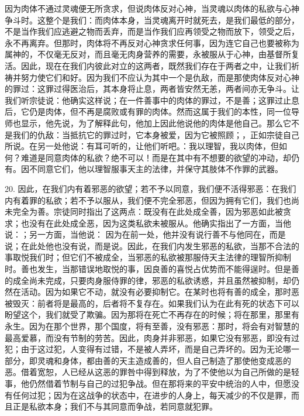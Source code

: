 因为肉体不通过灵魂便无所贪求，但说肉体反对心神，当灵魂以肉体的私欲与心神争斗时。这整个是我们：而肉体本身，当灵魂离开时就死去，是我们最低的部分，不是当作我们应逃避之物而丢弃，而是当作我们应再领受之物而放下，领受之后，永不再离弃。但那时，肉体将不再反对心神贪求任何事，因为连它自己也要被称为属神的，不仅毫无反对，而且毫无肉身营养的需要，永被服从于心神，由基督所复活。因此，现在在我们内彼此对立的这两者，既然我们存在于两者之中，让我们祈祷并努力使它们和好。因为我们不应认为其中一个是仇敌，而是那使肉体反对心神的罪过：这罪过得医治后，其本身将止息，两者皆安然无恙，两者间亦无争斗。让我们听宗徒说：他确实这样说；在一件善事中的肉体的罪过，不是善；这罪过止息后，它仍是肉体，但不再是腐败或有罪的肉体。然而这属于我们的本性，同一位导师也显示，他先说，为了解释此句，他加上因此他说他的肉体是他自己。那么它不是我们的仇敌：当抵抗它的罪过时，它本身被爱，因为它被照顾；，正如宗徒自己所说。在另一处他说：有耳可听的，让他们听吧。：我以理智，我以肉体，但如何？难道是同意肉体的私欲？绝不可以！而是在其中有不想要的欲望的冲动，却仍有。因不同意它们，他以理智服事天主的法律，并保守其肢体不作罪的武器。\par

20. 因此，在我们内有着邪恶的欲望；若不予以同意，我们便不活得邪恶：在我们内有着罪的私欲；若不予以服从，我们便不完全邪恶，但因为拥有它们，我们也尚未完全为善。宗徒同时指出了这两点：既没有在此处成全善，因为邪恶如此被贪求；也没有在此处成全恶，因为这类私欲未被服从。他确实指出了一方面，当他说：；另一方面，当他说： 因为在前一处，他并没有说行善不与他同在，而是说；在此处他也没有说，而是说。因此，在我们内发生邪恶的私欲，当那不合法的事取悦我们时；但它们不被成全，当邪恶的私欲被那服侍天主法律的理智所抑制时。善也发生，当那错误地取悦的事，因良善的喜悦占优势而不能得逞时。但是善的成全尚未完成，只要肉身服侍罪的律，邪恶的私欲诱惑，并且虽然被抑制，却仍然在活动。因为如果它不动，就没有必要抑制它。在某时也将有善的成全，那时恶被毁灭：前者将是最高的，后者将不复存在。如果我们认为在此有死的状态下可以盼望这个，我们就受了欺骗。因为那将在死亡不再存在的时候；将在那里，那里有永生。因为在那个世界，那个国度，将有至善，没有邪恶：那时，将会有对智慧的最高爱慕，而没有节制的劳苦。因此，肉身并非邪恶，如果它没有邪恶，即没有过犯；由于这过犯，人变得有过错，不是被人弄坏，而是自己弄坏的。因为无论哪一部分，即灵魂和身体，都由善的天主造成善的，但人自己制造了那使他变成恶的恶。借着宽恕，人已经从这恶的罪咎中得到释放，为了不使他以为自己所做的是轻事，他仍然借着节制与自己的过犯争战。但在那将来的平安中统治的人中，但愿没有任何过犯；因为在这战争的状态中，在进步的人身上，每天减少的不仅是罪，而且正是私欲本身；我们不与其同意而争战，若同意就犯罪。\par

